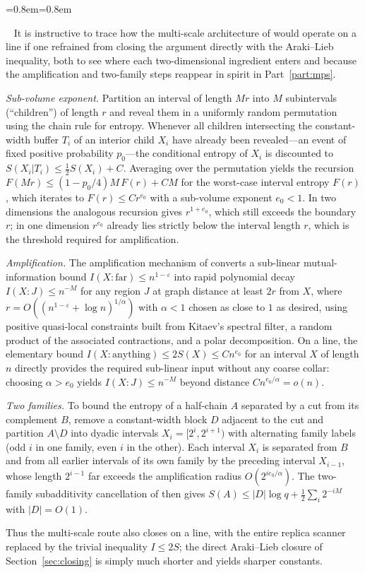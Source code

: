 \documentclass[aps,prx,reprint,superscriptaddress,floatfix,nofootinbib,longbibliography,amsmath,amssymb]{revtex4-2}
\theoremstyle{plain}
\theoremstyle{definition}
\newenvironment{inwords}{%
  \par\medskip\noindent
  \begin{list}{}{\leftmargin=0.8em\rightmargin=0.8em}
  \item\relax
  \noindent{\sffamily\bfseries\color{blue!40!black}In words.}\ \sffamily\small}{%
  \end{list}\par\medskip}
\begin{document}
\begin{inwords}
It is instructive to trace how the multi-scale architecture of \cite{AL}
would operate on a line if one refrained from closing the argument directly
with the Araki--Lieb inequality, both to see where each two-dimensional
ingredient enters and because the amplification and two-family steps
reappear in spirit in Part~\ref{part:mps}.

\emph{Sub-volume exponent.} Partition an interval of length $Mr$ into $M$
subintervals (``children'') of length $r$ and reveal them in a uniformly
random permutation using the chain rule for entropy. Whenever all children
intersecting the constant-width buffer $T_i$ of an interior child $X_i$
have already been revealed—an event of fixed positive probability
$p_0$—the conditional entropy of $X_i$ is discounted to
$S(X_i|T_i)\le\frac12S(X_i)+C$. Averaging over the permutation yields the
recursion $F(Mr)\le(1-p_0/4)M\,F(r)+C M$ for the worst-case interval
entropy $F(r)$, which iterates to $F(r)\le Cr^{e_0}$ with a sub-volume
exponent $e_0<1$. In two dimensions the analogous recursion gives
$r^{1+e_0}$, which still exceeds the boundary $r$; in one
dimension $r^{e_0}$ already lies strictly below the interval length $r$,
which is the threshold required for amplification.

\emph{Amplification.} The amplification mechanism of \cite[Section~10]{AL}
converts a sub-linear mutual-information bound
$I(X:\text{far})\le n^{1-\varepsilon}$ into rapid polynomial decay
$I(X:J)\le n^{-M}$ for any region $J$ at graph distance at least $2r$ from
$X$, where $r=O((n^{1-\varepsilon}+\log n)^{1/\alpha})$ with $\alpha<1$
chosen as close to $1$ as desired, using positive quasi-local constraints
built from Kitaev's spectral filter, a random product of the associated
contractions, and a polar decomposition. On a line, the elementary bound
$I(X:\text{anything})\le2S(X)\le Cn^{e_0}$ for an interval $X$ of length
$n$ directly provides the required sub-linear input without any coarse
collar: choosing $\alpha>e_0$ yields $I(X:J)\le n^{-M}$ beyond distance
$Cn^{e_0/\alpha}=o(n)$.

\emph{Two families.} To bound the entropy of a half-chain $A$ separated by
a cut from its complement $B$, remove a constant-width block $D$ adjacent
to the cut and partition $A\setminus D$ into dyadic intervals
$X_i=[2^i,2^{i+1})$ with alternating family labels (odd $i$ in one family,
even $i$ in the other). Each interval $X_i$ is separated from $B$ and from
all earlier intervals of its own family by the preceding interval
$X_{i-1}$, whose length $2^{i-1}$ far exceeds the amplification radius
$O(2^{ie_0/\alpha})$. The two-family subadditivity cancellation of
\cite{AL} then gives $S(A)\le|D|\log q+\frac12\sum_i2^{-iM}$ with
$|D|=O(1)$.

Thus the multi-scale route also closes on a line, with the entire replica
scanner replaced by the trivial inequality $I\le 2S$; the direct
Araki--Lieb closure of Section~\ref{sec:closing} is simply much shorter
and yields sharper constants.
\end{inwords}
\end{document}
